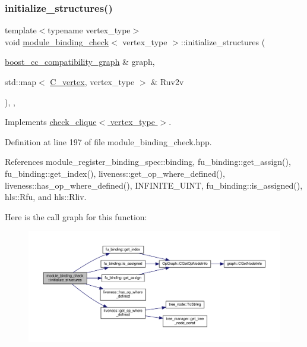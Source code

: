 \subsubsection{\texorpdfstring{initialize\+\_\+structures()}{initialize\_structures()}}
{\footnotesize\ttfamily template$<$typename vertex\+\_\+type$>$ \\
void \hyperlink{structmodule__binding__check}{module\+\_\+binding\+\_\+check}$<$ vertex\+\_\+type $>$\+::initialize\+\_\+structures (\begin{DoxyParamCaption}\item[{\hyperlink{clique__covering__graph_8hpp_af47b1c28cf9a2c360afafb8d80582ce6}{boost\+\_\+cc\+\_\+compatibility\+\_\+graph} \&}]{graph,  }\item[{std\+::map$<$ \hyperlink{clique__covering__graph_8hpp_a9cb45047ea8c5ed95a8cfa90494345aa}{C\+\_\+vertex}, vertex\+\_\+type $>$ \&}]{Ruv2v }\end{DoxyParamCaption})\hspace{0.3cm}{\ttfamily [inline]}, {\ttfamily [override]}, {\ttfamily [virtual]}}



Implements \hyperlink{structcheck__clique_a8355d3ba6eb71d487ffc36d48274db73}{check\+\_\+clique$<$ vertex\+\_\+type $>$}.



Definition at line 197 of file module\+\_\+binding\+\_\+check.\+hpp.



References module\+\_\+register\+\_\+binding\+\_\+spec\+::binding, fu\+\_\+binding\+::get\+\_\+assign(), fu\+\_\+binding\+::get\+\_\+index(), liveness\+::get\+\_\+op\+\_\+where\+\_\+defined(), liveness\+::has\+\_\+op\+\_\+where\+\_\+defined(), I\+N\+F\+I\+N\+I\+T\+E\+\_\+\+U\+I\+NT, fu\+\_\+binding\+::is\+\_\+assigned(), hls\+::\+Rfu, and hls\+::\+Rliv.

Here is the call graph for this function\+:
\nopagebreak
\begin{figure}[H]
\begin{center}
\leavevmode
\includegraphics[width=350pt]{d1/dc5/structmodule__binding__check_ac6f4b1e840b4bd490be992756f3c8c0e_cgraph}
\end{center}
\end{figure}
\mbox{\label{structmodule__binding__check_af4e3de311ec8e1aa996ebf0655faf0c5}} 
